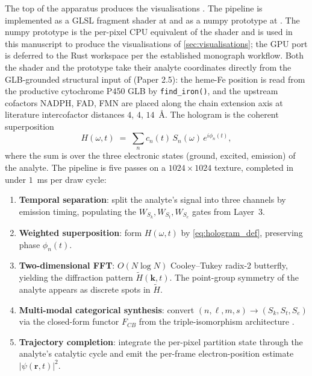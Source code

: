 \documentclass[11pt,twocolumn,a4paper]{article}
\theoremstyle{definition}
\theoremstyle{remark}
\begin{document}
The top of the apparatus produces the visualisations
\citep{sachikonye2025_holograms}. The pipeline is implemented as a
GLSL fragment shader at
and as a numpy prototype at
. The numpy
prototype is the per-pixel CPU equivalent of the shader and is used in
this manuscript to produce the visualisations of
\cref{sec:visualisations}; the GPU port is deferred to the Rust
workspace per the established monograph workflow. Both the shader and
the prototype take their analyte coordinates directly from the
GLB-grounded structural input of \citep{sachikonye2025_paper25} (Paper
2.5): the heme-Fe position is read from the productive cytochrome P450
GLB by \texttt{find\_iron()}, and the upstream cofactors NADPH, FAD,
FMN are placed along the chain extension axis at literature
intercofactor distances $4$, $4$, $14$~\AA. The hologram is the
coherent superposition
\begin{equation}
\label{eq:hologram_def}
H(\omega, t) \;=\; \sum_{n} c_n(t)\, S_n(\omega)\, e^{i \phi_n(t)},
\end{equation}
where the sum is over the three electronic states (ground, excited,
emission) of the analyte. The pipeline is five passes on a $1024 \times
1024$ texture, completed in under $1$~ms per draw cycle:
\begin{enumerate}[leftmargin=*, nosep]
\item \textbf{Temporal separation}: split the analyte's signal into
three channels by emission timing, populating the
$W_{S_k}, W_{S_t}, W_{S_e}$ gates from Layer~3.
\item \textbf{Weighted superposition}: form $H(\omega, t)$ by
\cref{eq:hologram_def}, preserving phase $\phi_n(t)$.
\item \textbf{Two-dimensional FFT}: $O(N \log N)$ Cooley--Tukey
radix-2 butterfly, yielding the diffraction pattern
$\widetilde{H}(\mathbf{k}, t)$. The point-group symmetry of the
analyte appears as discrete spots in $\widetilde{H}$.
\item \textbf{Multi-modal categorical synthesis}: convert
$(n, \ell, m, s) \to (S_k, S_t, S_e)$ via the closed-form functor
$F_{CB}$ from the triple-isomorphism architecture
\citep{sachikonye2025_isomorphism}.
\item \textbf{Trajectory completion}: integrate the per-pixel partition
state through the analyte's catalytic cycle and emit the per-frame
electron-position estimate $|\psi(\mathbf{r}, t)|^2$.
\end{enumerate}
\end{document}
